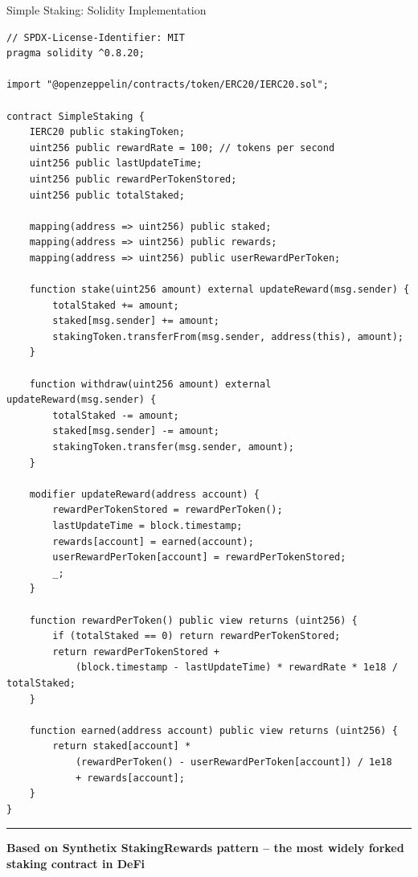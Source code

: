 \documentclass[8pt,aspectratio=169]{beamer}
\newcommand{\bottomnote}[1]{\vfill\vspace{-2mm}\textcolor{mllavender2}{\rule{\textwidth}{0.4pt}}\vspace{1mm}\footnotesize\textbf{#1}}
\begin{document}
\begin{frame}[fragile]{Simple Staking: Solidity Implementation}
\begin{lstlisting}
// SPDX-License-Identifier: MIT
pragma solidity ^0.8.20;

import "@openzeppelin/contracts/token/ERC20/IERC20.sol";

contract SimpleStaking {
    IERC20 public stakingToken;
    uint256 public rewardRate = 100; // tokens per second
    uint256 public lastUpdateTime;
    uint256 public rewardPerTokenStored;
    uint256 public totalStaked;

    mapping(address => uint256) public staked;
    mapping(address => uint256) public rewards;
    mapping(address => uint256) public userRewardPerToken;

    function stake(uint256 amount) external updateReward(msg.sender) {
        totalStaked += amount;
        staked[msg.sender] += amount;
        stakingToken.transferFrom(msg.sender, address(this), amount);
    }

    function withdraw(uint256 amount) external updateReward(msg.sender) {
        totalStaked -= amount;
        staked[msg.sender] -= amount;
        stakingToken.transfer(msg.sender, amount);
    }

    modifier updateReward(address account) {
        rewardPerTokenStored = rewardPerToken();
        lastUpdateTime = block.timestamp;
        rewards[account] = earned(account);
        userRewardPerToken[account] = rewardPerTokenStored;
        _;
    }

    function rewardPerToken() public view returns (uint256) {
        if (totalStaked == 0) return rewardPerTokenStored;
        return rewardPerTokenStored +
            (block.timestamp - lastUpdateTime) * rewardRate * 1e18 / totalStaked;
    }

    function earned(address account) public view returns (uint256) {
        return staked[account] *
            (rewardPerToken() - userRewardPerToken[account]) / 1e18
            + rewards[account];
    }
}
\end{lstlisting}
\bottomnote{Based on Synthetix StakingRewards pattern -- the most widely forked staking contract in DeFi}
\end{frame}
\end{document}
